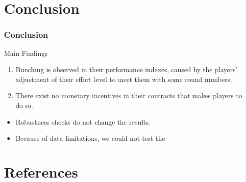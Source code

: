 \documentclass[dvipdfmx,12pt]{beamer}
\begin{document}
\section{Conclusion}

\begin{frame}\frametitle{Conclusion}
  Main Findings
  \begin{enumerate}
    \item Bunching is observed in their performance indexes, caused by the players' adjustment of their effort level to meet them with some round numbers.

    \item There exist no monetary incentives in their contracts that makes players to do so.

  \end{enumerate}

  \begin{itemize}
    \item Robustness checks do not change the results.

    \item Because of data limitations, we could not test the

  \end{itemize}

\end{frame}

\section*{References}
\end{document}
